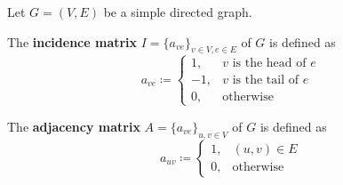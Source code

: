 \begin{definition}\label{def:graph_matrices}
  Let \( G = (V, E) \) be a simple directed graph.
  \begin{defenum}
    \cite[chapter 1, section 2.1]{Gondran1984} The \textbf{incidence matrix} \( I = \{ a_{ve} \}_{v \in V, e \in E} \) of \( G \) is defined as
    \begin{equation*}
      a_{ve} \coloneqq \begin{cases}
        1, &v \text{ is the head of } e \\
        -1, &v \text{ is the tail of } e \\
        0, &\text{otherwise}
      \end{cases}
    \end{equation*}

    \cite[chapter 1, section 2.3]{Gondran1984} The \textbf{adjacency matrix} \( A = \{ a_{ve} \}_{u, v \in V} \) of \( G \) is defined as
    \begin{equation*}
      a_{uv} \coloneqq \begin{cases}
        1, &(u, v) \in E \\
        0, &\text{otherwise}
      \end{cases}
    \end{equation*}
  \end{defenum}
\end{definition}

